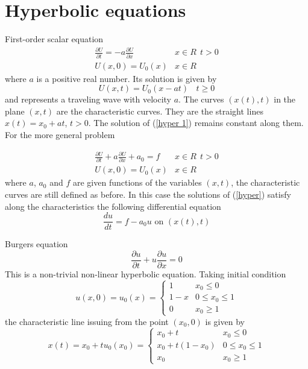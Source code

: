 \chapter{Hyperbolic equations}
First-order scalar equation
\begin{equation}
\label{hyper 1}
\begin{array}{cc}
\frac{\partial U}{\partial t} =-a\frac{\partial U}{\partial x}
& x \in R \ \ t >0\\
U(x,0)= U_0(x) & x \in R\end{array} \end{equation}
where $a$ is a positive real number. Its solution is given by
\[U(x,t) = U_0(x-at) \ \ \ \ t \geq 0 \] 
and represents a traveling wave with velocity $a$. The curves $(x(t),t)$ in 
the plane $(x,t)$ are the characteristic curves. They are the straight lines 
$x(t)=x_0+at$, $t >0$.
The solution of (\ref{hyper 1}) remains constant along them.\\
For the more general problem 
 
\begin{equation}
\label{hyper}
\begin{array}{cc}
\frac{\partial U}{\partial t}+ a\frac{\partial U}{\partial x}+a_0 = f 
& x \in R \ \ t >0\\
U(x,0)= U_0(x) & x \in R\end{array} \end{equation}
where 
$a$, $a_0$ and $f$ are given functions of the variables $(x,t)$, the characteristic
curves are still defined as before. In this case the solutions of (\ref{hyper})
satisfy along the characteristics the following differential equation
\[\frac{du}{dt}=f-a_0u \mbox{ on } (x(t),t) \]
\begin{example}
Burgers equation
\[\frac{\partial u}{\partial t}+ u\frac{\partial u}{\partial x} =0 \]
This is a non-trivial non-linear hyperbolic equation. Taking initial condition
\[ u(x,0) = u_0(x) = \left\{ \begin{array}{cc} 
1 & x_0\leq 0 \\
1-x & 0\leq x_0\leq 1 \\
0 & x_0\geq 1 
 \end{array} \right.\]
the characteristic line issuing from the point $(x_0,0)$ is given by
\[ x(t) = x_0+tu_0(x_0) = \left\{ \begin{array}{cc} 
x_0+t& x_0\leq 0 \\
x_0+t(1-x_0) & 0\leq x_0\leq 1 \\
x_0 & x_0\geq 1 
 \end{array} \right.\]
\end{example}
